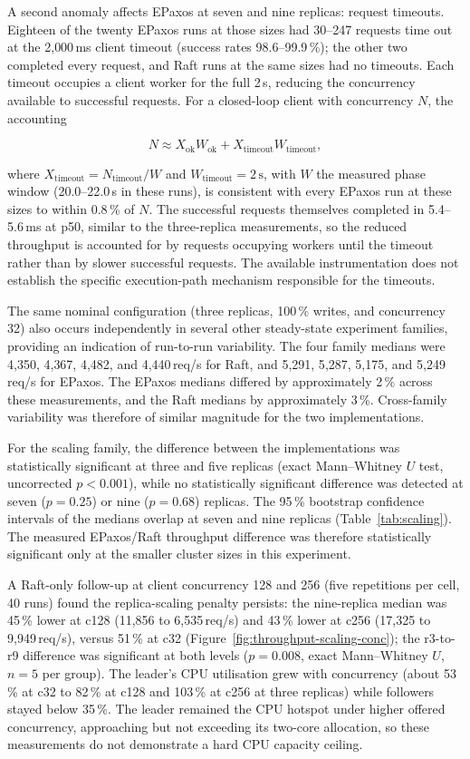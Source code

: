 A second anomaly affects EPaxos at seven and nine replicas: request
timeouts. Eighteen of the twenty EPaxos runs at those sizes had 30--247
requests time out at the 2{,}000\,ms client timeout (success rates
98.6--99.9\,\%); the other two completed every request, and Raft runs at the
same sizes had no timeouts. Each timeout occupies a
client worker for the full 2\,s, reducing the concurrency available to
successful requests. For a closed-loop client with concurrency $N$, the
accounting

$$
N \approx X_{\mathrm{ok}}W_{\mathrm{ok}}
  + X_{\mathrm{timeout}}W_{\mathrm{timeout}},
$$

where $X_{\mathrm{timeout}}=N_{\mathrm{timeout}}/W$ and
$W_{\mathrm{timeout}}=2\,\mathrm{s}$, with $W$ the measured phase window
(20.0--22.0\,s in these runs), is consistent with every EPaxos run at
these sizes to within 0.8\,\% of $N$. The successful requests themselves
completed in
5.4--5.6\,ms at p50, similar to the three-replica measurements, so the
reduced throughput is accounted for by requests occupying workers until the
timeout rather than by slower successful requests. The available
instrumentation does not establish the specific execution-path mechanism
responsible for the timeouts.

The same nominal configuration (three replicas, 100\,\% writes, and
concurrency 32) also occurs independently in several other steady-state
experiment families, providing an indication of run-to-run variability.
The four family medians were 4{,}350, 4{,}367,
4{,}482, and 4{,}440\,req/s for Raft, and 5{,}291, 5{,}287, 5{,}175, and
5{,}249\,req/s for EPaxos. The EPaxos medians differed by approximately
2\,\% across these measurements, and the Raft medians by approximately
3\,\%. Cross-family variability was therefore of similar magnitude for the
two implementations.

For the scaling family, the difference between the implementations was
statistically significant at three and five replicas (exact Mann--Whitney
$U$ test, uncorrected $p<0.001$), while no statistically significant difference was
detected at seven ($p=0.25$) or nine ($p=0.68$) replicas. The 95\,\%
bootstrap confidence intervals of the medians overlap at seven and nine
replicas (Table~\ref{tab:scaling}). The measured EPaxos/Raft throughput
difference was therefore statistically significant only at the smaller
cluster sizes in this experiment.

A Raft-only follow-up at client concurrency 128 and 256 (five
repetitions per cell, 40 runs) found the replica-scaling penalty
persists: the nine-replica median was 45\,\% lower at c128 (11{,}856 to
6{,}535\,req/s) and 43\,\% lower at c256 (17{,}325 to 9{,}949\,req/s),
versus 51\,\% at c32 (Figure~\ref{fig:throughput-scaling-conc}); the
r3-to-r9 difference was significant at both levels ($p=0.008$, exact
Mann--Whitney $U$, $n=5$ per group). The leader's CPU utilisation grew
with concurrency (about 53\,\% at c32 to 82\,\% at c128 and 103\,\% at
c256 at three replicas) while followers stayed below 35\,\%. The leader
remained the CPU hotspot under higher offered concurrency, approaching
but not exceeding its two-core allocation, so these measurements do not
demonstrate a hard CPU capacity ceiling.

